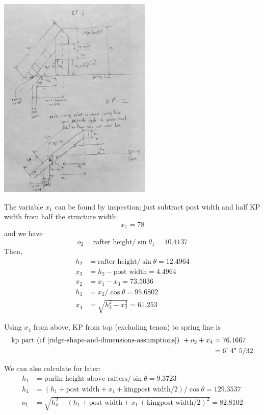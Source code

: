 \documentclass{article}\usepackage[]{graphicx}\usepackage[]{xcolor}
\begin{document}
\begin{center}
	\includegraphics[width=0.55\textwidth]{images/kingpost_and_collar_tie_lengths}
\end{center}

The variable $x_1$ can be found by inspection; just subtract post width and half KP width from half the structure width: 
\[ x_1 = 78\]
and we have 
\[ o_2 = \text{rafter height}/\sin\theta_1 = 10.4137 \]
Then, 
\begin{align*}
h_2 &= \text{rafter height}/\sin\theta = 12.4964\\
x_3 &= h_2 - \text{post width} = 4.4964\\
x_2 &= x_1 - x_3 = 73.5036\\
h_3 &= x_2/\cos\theta = 95.6802\\
x_4 &= \sqrt{h_3^2 - x_2^2} = 61.253
\end{align*}

Using $x_4$ from above, KP from top (excluding tenon) to spring line is 
\begin{align*}
\text{kp part (cf \Cref{ridge-shape-and-dimensions-assumptions}) } + o_2 + x_4 &= 76.1667\\
& = \text{6' 4" 5/32}
\end{align*}

We can also calculate for later:
\begin{align*}
h_1 &= \text{purlin height above rafters}/\sin\theta = 9.3723\\
h_4 &= (h_1 + \text{post width} + x_1 + \text{kingpost width}/2)/\cos\theta = 129.3537\\
o_1 &= \sqrt{h_4^2 - (h_1 + \text{post width} + x_1 + \text{kingpost width}/2)^2}  = 82.8102
\end{align*}
\end{document}
